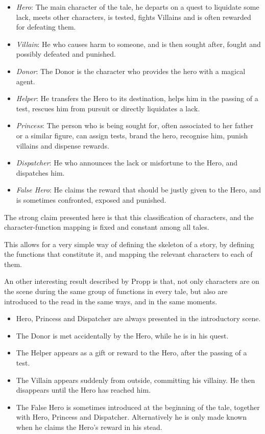 \documentclass[12pt,a4paper,oneside]{report}
\begin{document}
\begin{itemize}\setlength{\itemsep}{0pt}
\item \textit{Hero}: The main character of the tale, he departs on a quest to liquidate some lack, meets other characters, is tested, fights Villains and is often rewarded for defeating them.
\item \textit{Villain}: He who causes harm to someone, and is then sought after, fought and possibly defeated and punished.
\item \textit{Donor}: The Donor is the character who provides the hero with a magical agent.
\item \textit{Helper}: He transfers the Hero to its destination, helps him in the passing of a test, rescues him from pursuit or directly liquidates a lack.
\item \textit{Princess}: The person who is being sought for, often associated to her father or a similar figure, can assign tests, brand the hero, recognise him, punish villains and dispense rewards.
\item \textit{Dispatcher}: He who announces the lack or misfortune to the Hero, and dispatches him.
\item \textit{False Hero}: He claims the reward that should be justly given to the Hero, and is sometimes confronted, exposed and punished.
\end{itemize}

The strong claim presented here is that this classification of characters, and the character-function mapping is fixed and constant among all tales.

This allows for a very simple way of defining the skeleton of a story, by defining the functions that constitute it, and mapping the relevant characters to each of them.

\bigskip

An other interesting result described by Propp is that, not only characters are on the scene during the same group of functions in every tale, but also are introduced to the read in the same ways, and in the same moments.

\begin{itemize}\setlength{\itemsep}{0pt}
\item Hero, Princess and Dispatcher are always presented in the introductory scene.
\item The Donor is met accidentally by the Hero, while he is in his quest.
\item The Helper appears as a gift or reward to the Hero, after the passing of a test.
\item The Villain appears suddenly from outside, committing his villainy. He then disappears until the Hero has reached him.
\item The False Hero is sometimes introduced at the beginning of the tale, together with Hero, Princess and Dispatcher. Alternatively he is only made known when he claims the Hero's reward in his stead.
\end{itemize}
\end{document}
